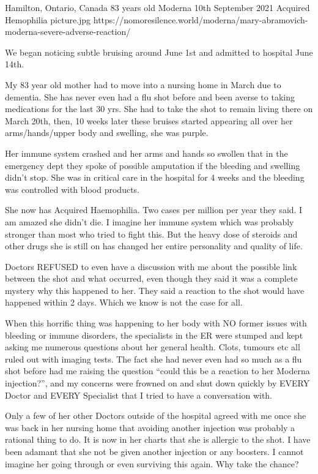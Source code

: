           {Hamilton, Ontario, Canada}
          {83 years old}
          {Moderna}
          {10th September 2021}
          {Acquired Hemophilia}
          {picture.jpg}
          {https://nomoresilence.world/moderna/mary-abramovich-moderna-severe-adverse-reaction/}
          {
          
\normalsize

We began noticing subtle bruising around June 1st and admitted to hospital June
14th.

My 83 year old mother had to move into a nursing home in March due to
dementia. She has never even had a flu shot before and been averse to taking
medications for the last 30 yrs. She had to take the shot to remain living there
on March 20th, then, 10 weeks later these bruises started appearing all over her
arms/hands/upper body and swelling, she was purple.

Her immune system crashed and her arms and hands so swollen that in the
emergency dept they spoke of possible amputation if the bleeding and swelling
didn’t stop. She was in critical care in the hospital for 4 weeks and the
bleeding was controlled with blood products.

She now has Acquired Haemophilia. Two cases per million per year they said. I am
amazed she didn’t die. I imagine her immune system which was probably stronger
than most who tried to fight this. But the heavy dose of steroids and other
drugs she is still on has changed her entire personality and quality of life.

Doctors REFUSED to even have a discussion with me about the possible link
between the shot and what occurred, even though they said it was a complete
mystery why this happened to her. They said a reaction to the shot would have
happened within 2 days. Which we know is not the case for all.

When this horrific thing was happening to her body with NO former issues with
bleeding or immune disorders, the specialists in the ER were stumped and kept
asking me numerous questions about her general health. Clots, tumours etc all
ruled out with imaging tests. The fact she had never even had so much as a flu
shot before had me raising the question “could this be a reaction to her Moderna
injection?”, and my concerns were frowned on and shut down quickly by EVERY
Doctor and EVERY Specialist that I tried to have a conversation with.

Only a few of her other Doctors outside of the hospital agreed with me once she
was back in her nursing home that avoiding another injection was probably a
rational thing to do. It is now in her charts that she is allergic to the
shot. I have been adamant that she not be given another injection or any
boosters. I cannot imagine her going through or even surviving this again. Why
take the chance?

}

